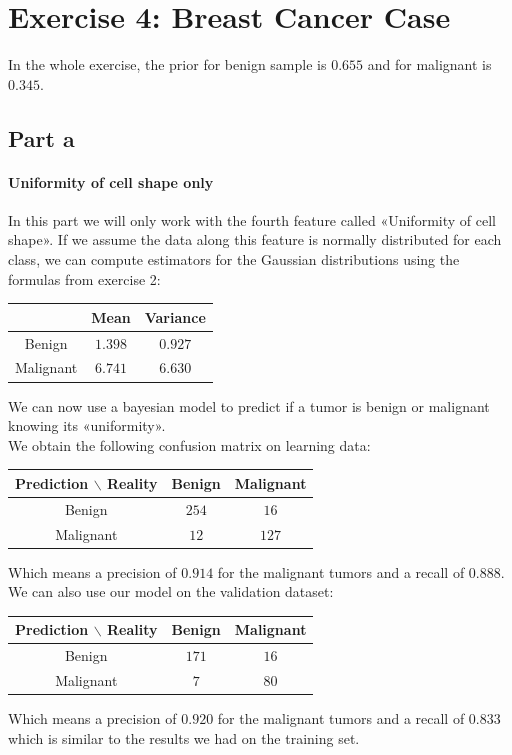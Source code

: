 \documentclass[a4paper, 10pt]{article}
\begin{document}
\section{Exercise 4: Breast Cancer Case}
In the whole exercise, the prior for benign sample is $0.655$ and for malignant is $0.345$.
\subsection{Part a}
\paragraph{Uniformity of cell shape only}
In this part we will only work with the fourth feature called «Uniformity of cell shape».
If we assume the data along this feature is normally distributed for each class, we can compute
estimators for the Gaussian distributions using the formulas from exercise 2:
\begin{center}
    \begin{tabular}{ |c|c|c| }
        \hline
        \ & Mean & Variance \\
        \hline
        Benign & $1.398$ & $ 0.927$ \\
        \hline
        Malignant & $6.741$ & $6.630$ \\ 
        \hline
    \end{tabular}
\end{center}
We can now use a bayesian model to predict if a tumor is benign or malignant knowing its «uniformity».
\\
We obtain the following confusion matrix on learning data:
\begin{center}
    \begin{tabular}{ |c|c|c| }
        \hline
        Prediction $\backslash$ Reality & Benign & Malignant \\
        \hline
        Benign & $254$ & $16$ \\
        \hline
        Malignant & $12$ & $127$ \\ 
        \hline
    \end{tabular}
\end{center}
Which means a precision of $0.914$ for the malignant tumors and a recall of $0.888$.
\\
We can also use our model on the validation dataset:
\begin{center}
    \begin{tabular}{ |c|c|c| }
        \hline
        Prediction $\backslash$ Reality & Benign & Malignant \\
        \hline
        Benign & $171$ & $16$ \\
        \hline
        Malignant & $7$ & $80$ \\ 
        \hline
    \end{tabular}
\end{center}
Which means a precision of $0.920$ for the malignant tumors and a recall of $0.833$ which is similar to
the results we had on the training set.
\end{document}
